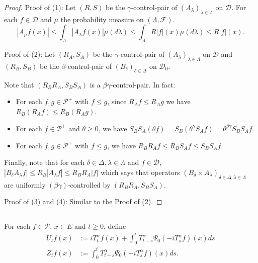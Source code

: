 \documentclass[12pt,oneside,english]{amsart}
\theoremstyle{plain}
\theoremstyle{definition}
\numberwithin{equation}{section}
\newcommand{\added}[1]{{\color{blue}#1}}\newcommand{\deleted}[1]{{\color{red}#1}}
\begin{document}
\begin{proof}
    Proof of (1): Let $(R,S)$ be the $\gamma$-control-pair of $(A_\lambda)_{\lambda\in\Lambda}$ on $\mathcal{D}$. For each $f \in \mathcal{D}$ and $\mu$ the probability measure on $(\Lambda, \mathscr F)$.
\[
   |A_{\mu}f(x)|\leq \int_{\Lambda}|A_{\lambda}f(x)|\mu(d\lambda) \leq \int_{\Lambda}R|f|(x)\mu(d\lambda) \leq R|f|(x).
\]

   	Proof of (2): Let $(R_A, S_A)$ be the $\gamma$-control-pair of $(A_\lambda)_{\lambda\in\Lambda}$ on $\mathcal{D}$ and $(R_B, S_B)$ be the $\beta$-control-pair of $(B_{\delta})_{\delta\in\Delta}$ on $\mathcal{D}_0$.
\added{ 
	Note that $(R_BR_A, S_BS_A)$ is a $\beta \gamma$-control-pair. 
	In fact:
\begin{itemize}
\item
	For each $f,g \in \mathcal P^+$ with $f\leq g$, since $R_Af \leq R_A g$ we have $R_B(R_A f)\leq R_B(R_A g)$.
\item
	For each $f\in \mathcal{P}^+$ and $\theta \geq 0$, we have $S_BS_A(\theta f)=S_B(\theta^{\gamma}S_Af)=\theta^{\beta\gamma}S_BS_Af$.
\item
	For each $f,g \in \mathcal P^+$ with $f\leq g$, we have $R_B R_A f \leq R_B S_A f \leq S_BS_A f$. 
\end{itemize}
	Finally, note that for each $\delta\in \Delta, \lambda\in\Lambda$ and $f\in \mathcal D$, $|B_{\delta}A_{\lambda}f|\leq R_B|A_{\lambda}f|\leq R_BR_A|f|$ which says that operators $(B_\delta\times A_\lambda)_{\delta \in \Delta, \lambda \in \Lambda}$ are uniformly $(\beta\gamma)$-controlled by $(R_BR_A,S_BS_A)$.
}
   
   Proof of (3) and (4): Similar to the Proof of (2).
\end{proof}
\subsection{}
    For each $f \in \mathcal{P}$, $x\in E$ and $t\geq 0$, define
\begin{align}
\label{eq: def of Zf}
    \tilde U_t f(x)
    &:= i T^\alpha_t f(x) + \int_0^t T^\alpha_{t-s} \Psi_0(-i T_s^{\alpha}f)(x)ds
    \\Z_t f (x)
    &:= \int_0^t T^\alpha_{t-s} \Psi_0(-i T_s^{\alpha}f)(x)ds.
\end{align}
\end{document}
